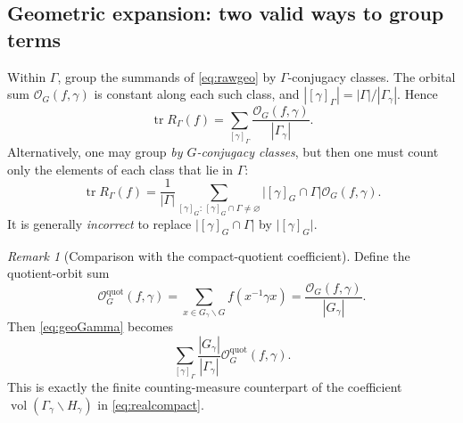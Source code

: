 \documentclass[12pt]{article}
\theoremstyle{remark}
\newtheorem{remark}[theorem]{Remark}
\newcommand{\tr}{\operatorname{tr}}
\newcommand{\Orb}{\mathcal O}
\begin{document}
\subsection{Geometric expansion: two valid ways to group terms}
Within $\Gamma$, group the summands of \eqref{eq:rawgeo} by
$\Gamma$-conjugacy classes.  The orbital sum
$\Orb_G(f,\gamma)$ is constant along each such class, and
$|[\gamma]_\Gamma|=|\Gamma|/|\Gamma_\gamma|$.
Hence
\begin{equation}\label{eq:geoGamma}
 \boxed{\displaystyle
 \tr R_\Gamma(f)=
 \sum_{[\gamma]_\Gamma}\frac{\Orb_G(f,\gamma)}{|\Gamma_\gamma|}.}
\end{equation}
Alternatively, one may group \emph{by $G$-conjugacy classes}, but
then one must count only the elements of each class that lie in
$\Gamma$:
\begin{equation}\label{eq:geoG}
 \tr R_\Gamma(f)=
 \frac1{|\Gamma|}\sum_{[\gamma]_G:\,[\gamma]_G\cap\Gamma\ne\varnothing}
 \bigl|[\gamma]_G\cap\Gamma\bigr|\Orb_G(f,\gamma).
\end{equation}
It is generally \emph{incorrect} to replace
$\bigl|[\gamma]_G\cap\Gamma\bigr|$ by
$\bigl|[\gamma]_G\bigr|$.

\begin{remark}[Comparison with the compact-quotient coefficient]
\label{rem:quotcoef}
Define the quotient-orbit sum
\[
 \Orb_G^{\mathrm{quot}}(f,\gamma)
  =\sum_{x\in G_\gamma\backslash G}f(x^{-1}\gamma x)
  =\frac{\Orb_G(f,\gamma)}{|G_\gamma|}.
\]
Then \eqref{eq:geoGamma} becomes
\[
 \sum_{[\gamma]_\Gamma}
  \frac{|G_\gamma|}{|\Gamma_\gamma|}
  \Orb_G^{\mathrm{quot}}(f,\gamma).
\]
This is exactly the finite counting-measure counterpart of the
coefficient $\operatorname{vol}(\Gamma_\gamma\backslash H_\gamma)$
in \eqref{eq:realcompact}.
\end{remark}
\end{document}
